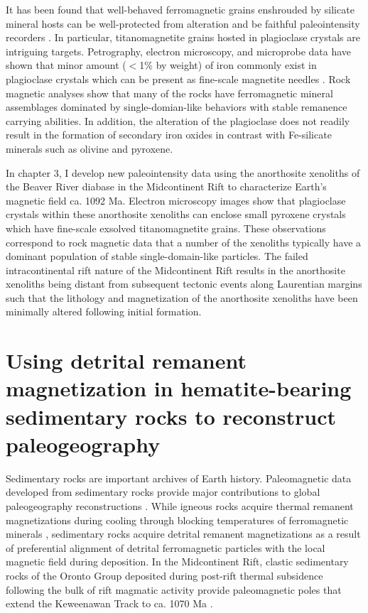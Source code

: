 It has been found that well-behaved ferromagnetic grains enshrouded by silicate mineral hosts can be well-protected from alteration and be faithful paleointensity recorders \citep{Cottrell1999a, Cottrell2000a, Tarduno2005a, Tarduno2006a, Cottrell2008a, Selkin2000a, Selkin2007a, Selkin2008a}. In particular, titanomagnetite grains hosted in plagioclase crystals are intriguing targets. Petrography, electron microscopy, and microprobe data have shown that minor amount ($<$1\% by weight) of iron commonly exist in plagioclase crystals which can be present as fine-scale magnetite needles \citep{Selkin2000a, Feinberg2005a, Feinberg2006a, Wenk2011a, Bian2021a}. Rock magnetic analyses show that many of the rocks have ferromagnetic mineral assemblages dominated by single-domian-like behaviors with stable remanence carrying abilities. In addition, the alteration of the plagioclase does not readily result in the formation of secondary iron oxides in contrast with Fe-silicate minerals such as olivine and pyroxene. 

In chapter 3, I develop new paleointensity data using the anorthosite xenoliths of the Beaver River diabase in the Midcontinent Rift to characterize Earth's magnetic field ca. 1092 Ma. Electron microscopy images show that plagioclase crystals within these anorthosite xenoliths can enclose small pyroxene crystals which have fine-scale exsolved titanomagnetite grains. These observations correspond to rock magnetic data that a number of the xenoliths typically have a dominant population of stable single-domain-like particles. The failed intracontinental rift nature of the Midcontinent Rift results in the anorthosite xenoliths being distant from subsequent tectonic events along Laurentian margins such that the lithology and magnetization of the anorthosite xenoliths have been minimally altered following initial formation. 

\section{Using detrital remanent magnetization in hematite-bearing sedimentary rocks to reconstruct paleogeography}

Sedimentary rocks are important archives of Earth history. Paleomagnetic data developed from sedimentary rocks provide major contributions to global paleogeography reconstructions \cite[e.g.][]{Torsvik2012a, Domeier2012a, Vaes2023a}. While igneous rocks acquire thermal remanent magnetizations during cooling through blocking temperatures of ferromagnetic minerals \citep{Neel1955a}, sedimentary rocks acquire detrital remanent magnetizations as a result of preferential alignment of detrital ferromagnetic particles with the local magnetic field during deposition. In the Midcontinent Rift, clastic sedimentary rocks of the Oronto Group deposited during post-rift thermal subsidence following the bulk of rift magmatic activity provide paleomagnetic poles that extend the Keweenawan Track to ca. 1070 Ma \citep{Henry1977a, Slotznick2023a}. 

